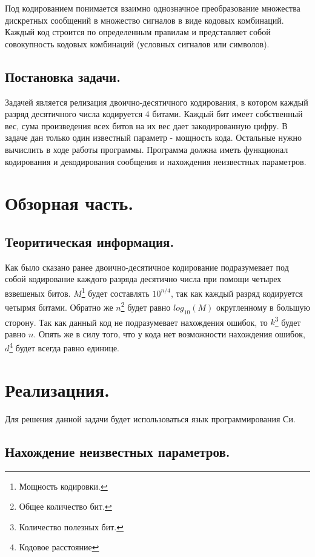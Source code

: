 \documentclass[12pt, a4paper]{report}
\begin{document}
Под кодированием понимается взаимно однозначное преобразование множества дискретных сообщений в множество сигналов в виде кодовых комбинаций. Каждый код строится по определенным правилам и представляет собой совокупность кодовых комбинаций (условных сигналов или символов).

\subsection*{Постановка задачи.}

Задачей является релизация двоично-десятичного кодирования, в котором каждый разряд десятичного числа кодируется 4 битами. Каждый бит имеет собственный вес, сума произведения всех битов на их вес дает закодированную цифру. 
В задаче дан только один известный параметр - мощность кода. Остальные нужно вычислить в ходе работы программы.
Программа должна иметь функционал кодирования и декодирования сообщения и нахождения неизвестных параметров.

\section*{Обзорная часть.}

\subsection*{Теоритическая информация.}

Как было сказано ранее двоично-десятичное кодирование подразумевает под собой кодирование каждого разряда десятично числа при помощи четырех взвешеных битов. $M$\footnote{Мощность кодировки.} будет составлять $ 10^{n/4} $, так как каждый разряд кодируется четырмя битами. Обратно же $n$\footnote{Общее количество бит.} будет равно $ log_{10} (M) $ округленному в большую сторону. Так как данный код не подразумевает нахождения ошибок, то $k$\footnote{Количество полезных бит.} будет равно $n$. Опять же в силу того, что у кода нет возможности нахождения ошибок, $d$\footnote{Кодовое расстояние} будет всегда равно единице.

\newpage
\section*{Реализацния.}

Для решения данной задачи будет использоваться язык программирования Си.

\subsection*{Нахождение неизвестных параметров.}
\end{document}
